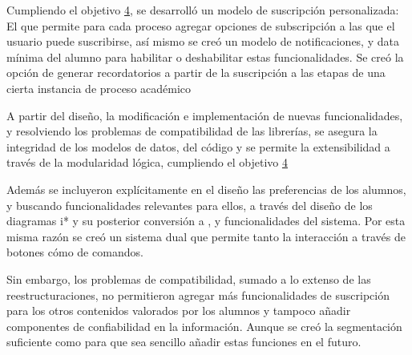     \par  Cumpliendo el objetivo \href{sec:obj-e}{4}, se desarrolló un modelo de suscripción personalizada: El que permite para cada proceso agregar opciones de subscripción a las que el usuario puede suscribirse, así mismo se creó un modelo de notificaciones, y data mínima del alumno para habilitar o deshabilitar estas funcionalidades. Se creó la opción de generar recordatorios a partir de la suscripción a las etapas de una cierta instancia de proceso académico
    \par A partir del diseño, la modificación e implementación
    de nuevas funcionalidades, y resolviendo los problemas de compatibilidad de las librerías, se asegura la integridad de los modelos de datos, del código y se permite la extensibilidad a través de la modularidad lógica, cumpliendo el objetivo \href{sec:obj-e}{4}
    \par Además se incluyeron explícitamente en el diseño las preferencias de los alumnos, y buscando funcionalidades relevantes para ellos, a través del diseño de los diagramas \gls{i*} y su posterior conversión a                                                                                                                                                                                                                                                                                                                                                                                                                                                                                                                                                                                                                                                                                                                                                                                                                                                                                                      , y funcionalidades del sistema. Por esta misma razón se creó un sistema dual que permite tanto la interacción a través de botones cómo de comandos.

    \par Sin embargo, los problemas de compatibilidad, sumado a lo extenso de las reestructuraciones, no permitieron agregar más funcionalidades de suscripción para los otros contenidos valorados por los alumnos y tampoco añadir componentes de confiabilidad en la información. Aunque se creó la segmentación suficiente como para que sea sencillo añadir estas funciones en el futuro.

